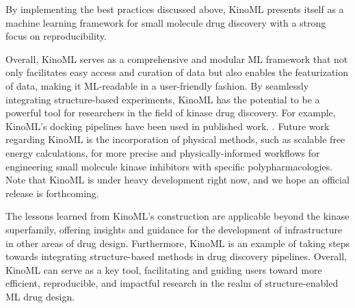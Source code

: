 \documentclass[9pt,lessons]{livecoms}
\begin{document}
By implementing the best practices discussed above, KinoML presents itself as a machine learning framework for small molecule drug discovery with a strong focus on reproducibility.  %


Overall, KinoML serves as a comprehensive and modular ML framework that not only facilitates easy access and curation of data but also enables the featurization of data, making it ML-readable in a user-friendly fashion. By seamlessly integrating structure-based experiments, KinoML has the potential to be a powerful tool for researchers in the field of kinase drug discovery. For example, KinoML's docking pipelines have been used in published work. \cite{backenkohler2023guided, schaller2023benchmarking}.  Future work regarding KinoML is the incorporation of physical methods, such as scalable free energy calculations, for more precise and physically-informed workflows for engineering small molecule kinase inhibitors with specific polypharmacologies. Note that KinoML is under heavy development right now, and we hope an official release is forthcoming.

The lessons learned from KinoML's construction are applicable beyond the kinase superfamily, offering insights and guidance for the development of infrastructure in other areas of drug design. Furthermore, Kino\-ML is an example of taking steps towards integrating structure-based methods in drug discovery pipelines. Overall, KinoML can serve as a key tool, facilitating and guiding users toward more efficient, reproducible, and impactful research in the realm of structure-enabled ML drug design.


\end{document}
